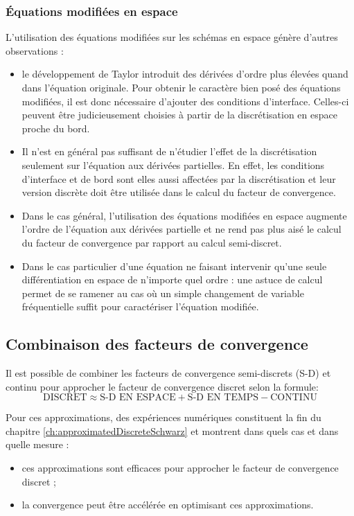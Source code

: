 \subsubsection*{Équations modifiées en espace}
L'utilisation des équations modifiées sur les schémas en espace
génère d'autres observations :
\begin{itemize}
	\item 
	le développement de Taylor introduit des dérivées
d'ordre plus élevées quand dans l'équation originale. Pour
obtenir le caractère bien posé des équations modifiées, il est donc
nécessaire d'ajouter des conditions d'interface. Celles-ci peuvent
être judicieusement choisies à partir de la discrétisation en espace
proche du bord.
	\item Il n'est en général pas suffisant de n'étudier
		l'effet de la discrétisation seulement sur
		l'équation aux dérivées partielles. En effet,
		les conditions d'interface et de bord sont
		elles aussi affectées par la discrétisation et
		leur version discrète doit être utilisée
		dans le calcul du facteur de convergence.
	\item Dans le cas général, l'utilisation des équations
	modifiées en espace augmente l'ordre de l'équation aux
	dérivées partielle et ne rend pas plus aisé
	le calcul du facteur de convergence par rapport
		au calcul semi-discret.
	\item Dans le cas particulier d'une équation ne faisant
	intervenir
	qu'une seule différentiation en espace de n'importe
	quel ordre :
	une astuce de calcul permet de se ramener au cas où un simple
	changement de variable fréquentielle suffit pour caractériser
		l'équation modifiée.
\end{itemize}
%
\subsection*{Combinaison des facteurs de convergence}
Il est possible de combiner les facteurs
de convergence semi-discrets (S-D) et continu pour approcher le
facteur de convergence discret selon la formule:
\begin{equation}
	\text{DISCRET} \approx
	\text{S-D EN ESPACE} +
	\text{S-D EN TEMPS} -
	\text{CONTINU}
\end{equation}
%
\par
Pour ces approximations, des expériences numériques constituent la fin
du chapitre \ref{ch:approximatedDiscreteSchwarz} et montrent dans quels cas et dans quelle mesure :
\begin{itemize}
	\item
ces approximations sont efficaces pour approcher le facteur
de convergence discret ;
	\item
la convergence
peut être accélérée en optimisant ces approximations.
\end{itemize}
